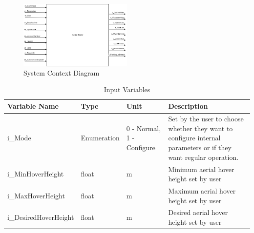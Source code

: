 \documentclass{article}
\begin{document}
\begin{figure}[!h]
  \begin{center} 
  \caption{System Context Diagram} 
 
        \includegraphics[width=0.5\textwidth]{ContextDiagram.png}
  \end{center}
\end{figure}



\begin{table}[!h]
\begin{center}
\caption {Input Variables} \label{tab:title}
\label{InputVariables}
\begin{tabular}{ | m{3cm} | m{2cm} | m{2cm} | m{6cm} | } 
\hline
 Variable Name & Type & Unit & Description \\ 
 \hline
i\_Mode & Enumeration & 	0 - Normal, 1 - Configure &	Set by the user to choose whether they want to configure internal parameters or if they want regular operation. \\
\hline i\_MinHoverHeight & float	&m	& Minimum aerial hover height set by user\\
\hline i\_MaxHoverHeight & float	&m	& Maximum aerial hover height set by user\\
\hline i\_DesiredHoverHeight & float	&m	& Desired aerial hover height set by user\\
\hline 
\end{tabular}
\end{center}
\end{table}
\end{document}
